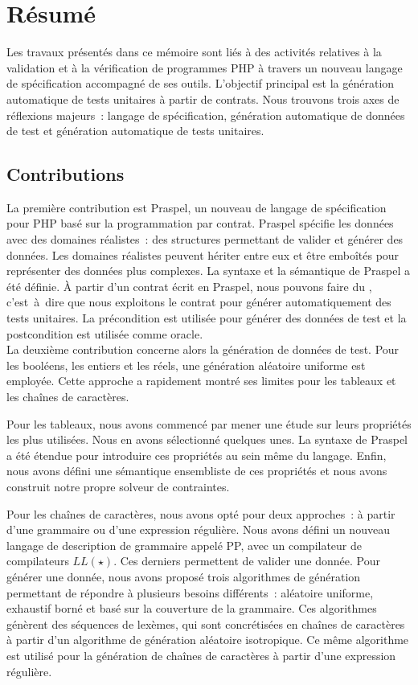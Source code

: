 \chapter*{Résumé}

Les travaux présentés dans ce mémoire sont liés à des activités relatives à la
validation et à la vérification de programmes PHP à travers un nouveau langage
de spécification accompagné de ses outils. L'objectif principal est la
génération automatique de tests unitaires à partir de contrats. Nous trouvons
trois axes de réflexions majeurs~: langage de spécification, génération
automatique de données de test et génération automatique de tests unitaires.

\renewcommand*\thesection{\arabic{section}}
\setcounter{section}{0}
\section{Contributions}

La première contribution est Praspel, un nouveau de langage de spécification
pour PHP basé sur la programmation par contrat. Praspel spécifie les données
avec des domaines réalistes~: des structures permettant de valider et générer
des données. Les domaines réalistes peuvent hériter entre eux et être emboîtés
pour représenter des données plus complexes. La syntaxe et la sémantique de
Praspel a été définie. À partir d'un contrat écrit en Praspel, nous pouvons
faire du , c'est~à~dire que nous exploitons le
contrat pour générer automatiquement des tests unitaires. La précondition est
utilisée pour générer des données de test et la postcondition est utilisée comme
oracle. \\

La deuxième contribution concerne alors la génération de données de test. Pour
les booléens, les entiers et les réels, une génération aléatoire uniforme est
employée. Cette approche a rapidement montré ses limites pour les tableaux et
les chaînes de caractères.

Pour les tableaux, nous avons commencé par mener une étude sur leurs propriétés
les plus utilisées. Nous en avons sélectionné quelques unes. La syntaxe de
Praspel a été étendue pour introduire ces propriétés au sein même du langage.
Enfin, nous avons défini une sémantique ensembliste de ces propriétés et nous
avons construit notre propre solveur de contraintes.

Pour les chaînes de caractères, nous avons opté pour deux approches~: à partir
d'une grammaire ou d'une expression régulière. Nous avons défini un nouveau
langage de description de grammaire appelé PP, avec un compilateur de
compilateurs $LL(\star)$. Ces derniers permettent de valider une donnée. Pour
générer une donnée, nous avons proposé trois algorithmes de génération
permettant de répondre à plusieurs besoins différents~: aléatoire uniforme,
exhaustif borné et basé sur la couverture de la grammaire. Ces algorithmes
génèrent des séquences de lexèmes, qui sont concrétisées en chaînes de
caractères à partir d'un algorithme de génération aléatoire isotropique. Ce même
algorithme est utilisé pour la génération de chaînes de caractères à partir
d'une expression régulière.

